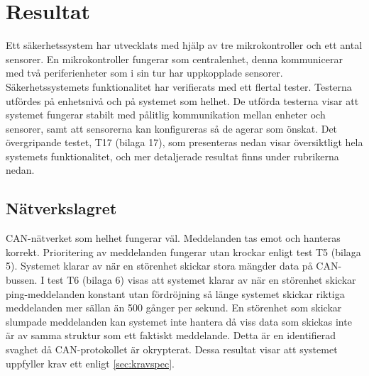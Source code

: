\section{Resultat}
\label{sec:resultat}



Ett säkerhetssystem har utvecklats med hjälp av tre mikrokontroller och ett antal sensorer. En mikrokontroller fungerar som centralenhet, denna kommunicerar med två periferienheter som i sin tur har uppkopplade sensorer. Säkerhetssystemets funktionalitet har verifierats med ett flertal tester. Testerna utfördes på enhetsnivå och på systemet som helhet. De utförda testerna visar att systemet fungerar stabilt med pålitlig kommunikation mellan enheter och sensorer, samt att sensorerna  kan konfigureras så de agerar som önskat. Det övergripande testet, T17 (bilaga 17), som presenteras nedan visar översiktligt hela systemets funktionalitet, och mer detaljerade resultat finns under rubrikerna nedan. 



\subsection{Nätverkslagret}

CAN-nätverket som helhet fungerar väl. Meddelanden tas emot och hanteras korrekt. Prioritering av meddelanden fungerar utan krockar enligt test T5 (bilaga 5). Systemet klarar av när en störenhet skickar stora mängder data på CAN-bussen. I test T6 (bilaga 6) visas att systemet klarar av när en störenhet skickar ping-meddelanden konstant utan fördröjning så länge systemet skickar riktiga meddelanden mer sällan än 500 gånger per sekund.
\newline\newline
En störenhet som skickar slumpade meddelanden kan systemet inte hantera då viss data som skickas inte är av samma struktur som ett faktiskt meddelande.
Detta är en identifierad svaghet då CAN-protokollet är okrypterat. Dessa resultat visar att systemet uppfyller krav ett enligt \ref{sec:kravspec}. 

